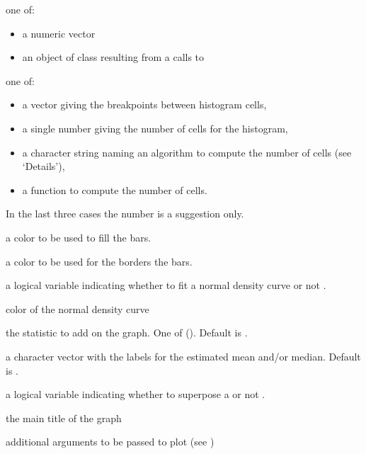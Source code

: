 \documentclass[a4paper]{book}
\begin{document}
\begin{Arguments}
\begin{ldescription}
\item[\code{dat}] one of:
\begin{itemize}

\item a numeric vector
\item an object of class  resulting from a
calls to 

\end{itemize}


\item[\code{breaks}] one of:
\begin{itemize}

\item a vector giving the breakpoints between histogram cells,
\item a single number giving the number of cells for the histogram,
\item a character string naming an algorithm to compute the
number of cells (see `Details'),
\item a function to compute the number of cells.

\end{itemize}

In the last three cases the number is a suggestion only.

\item[\code{barc}] a color to be used to fill the bars.
\item[\code{borc}] a color to be used for the borders the bars.
\item[\code{fit.norm}] a logical variable indicating whether to fit a normal density
curve  or not .
\item[\code{lcol}] color of the normal density curve
\item[\code{stat}] the statistic to add on the graph. One of (). Default is .
\item[\code{stat.lab}] a character vector with the labels for the estimated mean and/or median. Default is .
\item[\code{rug}] a logical variable indicating whether to superpose a 
 or not .
\item[\code{main}] the main title of the graph
\item[\code{...}] additional arguments to be passed to plot (see )

\end{ldescription}
\end{Arguments}
\end{document}
